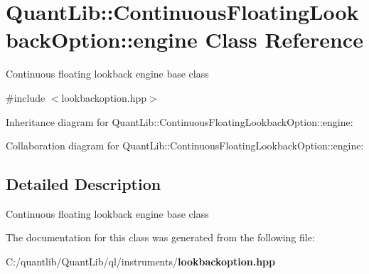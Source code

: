 \section{Quant\+Lib\+:\+:Continuous\+Floating\+Lookback\+Option\+:\+:engine Class Reference}
\label{class_quant_lib_1_1_continuous_floating_lookback_option_1_1engine}


Continuous floating lookback engine base class  




{\ttfamily \#include $<$lookbackoption.\+hpp$>$}



Inheritance diagram for Quant\+Lib\+:\+:Continuous\+Floating\+Lookback\+Option\+:\+:engine\+:


Collaboration diagram for Quant\+Lib\+:\+:Continuous\+Floating\+Lookback\+Option\+:\+:engine\+:


\subsection{Detailed Description}
Continuous floating lookback engine base class 

The documentation for this class was generated from the following file\+:\begin{DoxyCompactItemize}
\item 
C\+:/quantlib/\+Quant\+Lib/ql/instruments/{\bf lookbackoption.\+hpp}\end{DoxyCompactItemize}
